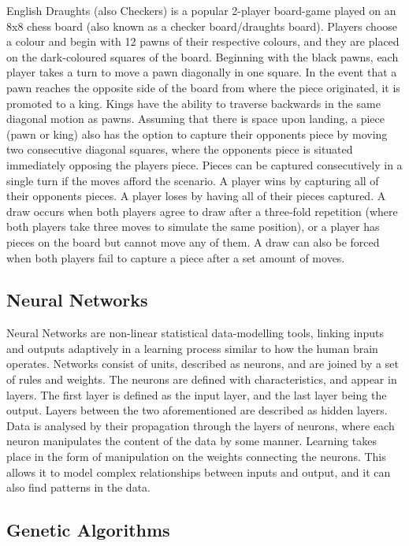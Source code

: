 \documentclass[12pt,a4paper]{article}
\begin{document}
    English Draughts (also Checkers) is a popular 2-player board-game played on an 8x8 chess board (also known as a checker board/draughts board). Players choose a colour and begin with 12 pawns of their respective colours, and they are placed on the dark-coloured squares of the board. Beginning with the black pawns, each player takes a turn to move a pawn diagonally in one square. In the event that a pawn reaches the opposite side of the board from where the piece originated, it is promoted to a king. Kings have the ability to traverse backwards in the same diagonal motion as pawns. Assuming that there is space upon landing, a piece (pawn or king) also has the option to capture their opponents piece by moving two consecutive diagonal squares, where the opponents piece is situated immediately opposing the players piece. Pieces can be captured consecutively in a single turn if the moves afford the scenario. A player wins by capturing all of their opponents pieces. A player loses by having all of their pieces captured. A draw occurs when both players agree to draw after a three-fold repetition (where both players take three moves to simulate the same position), or a player has pieces on the board but cannot move any of them. A draw can also be forced when both players fail to capture a piece after a set amount of moves.

    \subsection{Neural Networks}

    Neural Networks are non-linear statistical data-modelling tools, linking inputs and outputs adaptively in a learning process similar to how the human brain operates. Networks consist of units, described as neurons, and are joined by a set of rules and weights. The neurons are defined with characteristics, and appear in layers. The first layer is defined as the input layer, and the last layer being the output. Layers between the two aforementioned are described as hidden layers. Data is analysed by their propagation through the layers of neurons, where each neuron manipulates the content of the data by some manner. Learning takes place in the form of manipulation on the weights connecting the neurons. This allows it to model complex relationships between inputs and output, and it can also find patterns in the data. 

 	\subsection{Genetic Algorithms}
\end{document}

